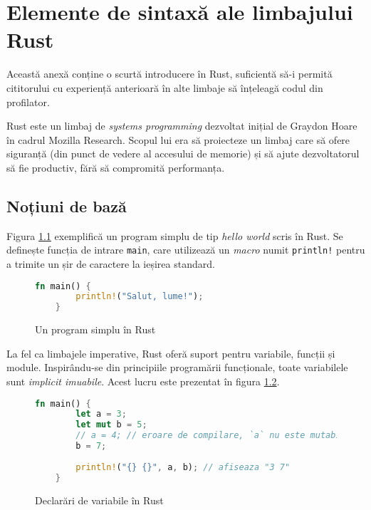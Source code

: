 \chapter{Elemente de sintaxă ale limbajului Rust}

Această anexă conține o scurtă introducere în Rust, suficientă să-i permită cititorului cu experiență anterioară în alte limbaje să înțeleagă codul din profilator.

Rust este un limbaj de \textit{systems programming} dezvoltat inițial de Graydon Hoare în cadrul Mozilla Research. Scopul lui era să proiecteze un limbaj care să ofere siguranță (din punct de vedere al accesului de memorie) și să ajute dezvoltatorul să fie productiv, fără să compromită performanța.

\section*{Noțiuni de bază}

Figura \ref{fig:rust_hello_world} exemplifică un program simplu de tip \textit{hello world} scris în Rust. Se definește funcția de intrare \texttt{main}, care utilizează un \textit{macro} numit \texttt{println!} pentru a trimite un șir de caractere la ieșirea standard.

\begin{figure}[h]
    \centering
    \begin{lstlisting}[language=Rust]
    fn main() {
        println!("Salut, lume!");
    }
    \end{lstlisting}
    \caption{Un program simplu în Rust}
    \label{fig:rust_hello_world}
\end{figure}

La fel ca limbajele imperative, Rust oferă suport pentru variabile, funcții și module. Inspirându-se din principiile programării funcționale, toate variabilele sunt \textit{implicit imuabile}. Acest lucru este prezentat în figura \ref{fig:rust_variables}.

\begin{figure}[ht]
    \centering
    \begin{lstlisting}[language=Rust]
    fn main() {
        let a = 3;
        let mut b = 5;
        // a = 4; // eroare de compilare, `a` nu este mutabil
        b = 7;
        
        println!("{} {}", a, b); // afiseaza "3 7"
    }
    \end{lstlisting}
    \caption{Declarări de variabile în Rust}
    \label{fig:rust_variables}
\end{figure}

